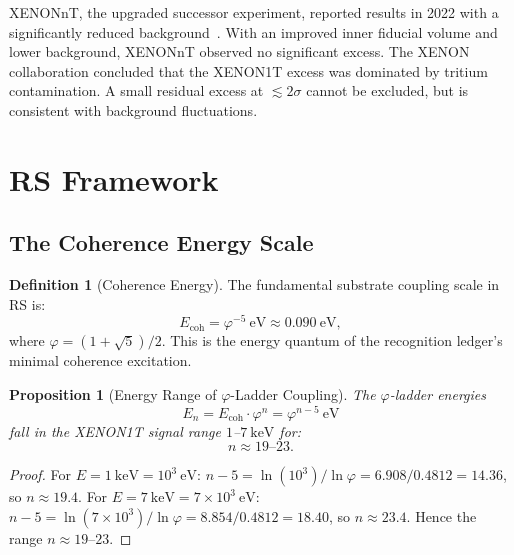 \documentclass[12pt,a4paper]{article}
\newtheorem{proposition}[theorem]{Proposition}
\theoremstyle{definition}
\newtheorem{definition}[theorem]{Definition}
\theoremstyle{remark}
\begin{document}
XENONnT, the upgraded successor experiment, reported results in 2022
with a significantly reduced background~\cite{XENONnT2022}.  With an
improved inner fiducial volume and lower background, XENONnT observed
no significant excess.  The XENON collaboration concluded that the
XENON1T excess was dominated by tritium contamination.  A small
residual excess at $\lesssim 2\sigma$ cannot be excluded, but is
consistent with background fluctuations.

\section{RS Framework}
\label{sec:framework}

\subsection{The Coherence Energy Scale}

\begin{definition}[Coherence Energy]
\label{def:ecoh}
The fundamental substrate coupling scale in RS is:
\begin{equation}
  E_{\mathrm{coh}} = \varphi^{-5}~\mathrm{eV} \approx 0.090~\mathrm{eV},
\end{equation}
where $\varphi = (1+\sqrt{5})/2$.  This is the energy quantum of the
recognition ledger's minimal coherence excitation.
\end{definition}

\begin{proposition}[Energy Range of $\varphi$-Ladder Coupling]
\label{prop:range}
The $\varphi$-ladder energies
\begin{equation}
  E_n = E_{\mathrm{coh}} \cdot \varphi^n = \varphi^{n-5}~\mathrm{eV}
\end{equation}
fall in the XENON1T signal range $1$--$7~\mathrm{keV}$ for:
\begin{equation}
  n \approx 19\text{--}23.
\end{equation}
\end{proposition}

\begin{proof}
For $E = 1~\mathrm{keV} = 10^3~\mathrm{eV}$:
$n - 5 = \ln(10^3)/\ln\varphi = 6.908/0.4812 = 14.36$, so $n \approx 19.4$.
For $E = 7~\mathrm{keV} = 7 \times 10^3~\mathrm{eV}$:
$n - 5 = \ln(7 \times 10^3)/\ln\varphi = 8.854/0.4812 = 18.40$, so
$n \approx 23.4$.  Hence the range $n \approx 19$--$23$.
\end{proof}
\end{document}
